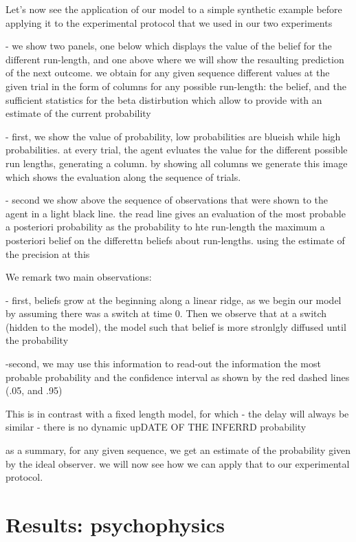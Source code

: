 \documentclass[profile,final,english, draft]{article}%
\begin{document}
Let's now see the application of our model to a simple synthetic example before applying it to the experimental protocol that we used in our two experiments


- we show two panels, one below which displays the value of the belief for the different run-length, and one above where we will show the resaulting prediction of the next outcome.
we obtain for any given sequence different values at the given trial in the form of columns for any possible run-length: the belief,
and the sufficient statistics for the beta distirbution which allow to provide with an estimate of the current probability

- first, we show the value of probability, low probabilities are blueish while high probabilities. at every trial, the agent evluates the value for the different possible run lengths, generating a column. by showing all columns we generate this image which shows the evaluation along the sequence of trials.

- second we show above the sequence of observations that were shown to the agent in a light black line. the read line gives an evaluation of the most probable a posteriori probability as the probability to hte run-length the maximum a posteriori belief on the differettn beliefs about run-lengths. using the estimate of the precision at this

We remark two main observations:

- first, beliefs grow at the beginning along a linear ridge, as we begin our model by assuming there was a switch at time 0. Then we observe that at a switch (hidden to the model), the model
such that belief is more stronlgly diffused until the probability

-second, we may use this information to read-out the information the most probable probability and the confidence interval as shown by the red dashed lines (.05, and .95)


This is in contrast with a fixed length model, for which
- the delay will always be similar
- there is no dynamic upDATE OF THE INFERRD probability


as a summary, for any given sequence, we get an estimate of the probability given by the ideal observer. we will now see how we can apply that to our experimental protocol.


\section{Results: psychophysics}
\end{document}
